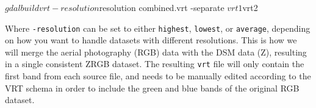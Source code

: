 \begin{shellcode}
$ gdalbuildvrt -resolution ${resolution} combined.vrt -separate ${vrt1} ${vrt2} 
\end{shellcode}
%
Where \texttt{-resolution} can be set to either \texttt{highest}, \texttt{lowest}, or \texttt{average}, depending on how you want to handle datasets with different resolutions.
This is how we will merge the aerial photography (RGB) data with the DSM data (Z), resulting in a single consistent ZRGB dataset.
The resulting \texttt{vrt} file will only contain the first band from each source file, and needs to be manually edited according to the VRT schema \cite{vrt_schema_2015} in order to include the green and blue bands of the original RGB dataset.
